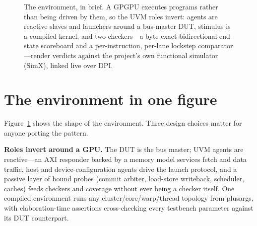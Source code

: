 \documentclass[conference]{IEEEtran}
\begin{document}
\begin{figure}[t]
	\caption{The environment, in brief. A GPGPU executes programs rather
		than being driven by them, so the UVM roles invert: agents are
		reactive slaves and launchers around a bus-master DUT, stimulus is a
		compiled kernel, and two checkers---a byte-exact bidirectional
		end-state scoreboard and a per-instruction, per-lane lockstep
		comparator---render verdicts against the project's own functional
		simulator (SimX), linked live over DPI.}
	\label{fig:arch}
\end{figure}

\section{The environment in one figure}
Figure~\ref{fig:arch} shows the shape of the environment. Three
design choices matter for anyone porting the pattern.

\textbf{Roles invert around a GPU.} The DUT is the bus master; UVM
agents are reactive---an AXI responder backed by a memory model
services fetch and data traffic, host and device-configuration agents
drive the launch protocol, and a passive layer of bound probes
(commit arbiter, load-store writeback, scheduler, caches) feeds
checkers and coverage without ever being a checker itself. One
compiled environment runs any cluster/core/warp/thread topology from
plusargs, with elaboration-time assertions cross-checking every
testbench parameter against its DUT counterpart.
\end{document}
